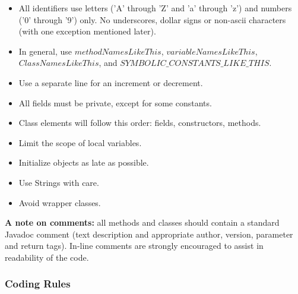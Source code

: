 \documentclass[12pt]{article}
\begin{document}
\begin{itemize}

\item All identifiers use letters ('A' through 'Z' and 'a' through 'z') and numbers ('0' through '9') only. No underscores, dollar signs or non-ascii characters (with one exception mentioned later).

\item In general, use $methodNamesLikeThis$, $variableNamesLikeThis$, $ClassNamesLikeThis$, and $SYMBOLIC\_CONSTANTS\_LIKE\_THIS$.

\item Use a separate line for an increment or decrement.

\item All fields must be private, except for some constants.

\item Class elements will follow this order: fields, constructors, methods.

\item Limit the scope of local variables.

\item Initialize objects as late as possible.

\item Use Strings with care.

\item Avoid wrapper classes.

\end{itemize}

\textbf{A note on comments:} all methods and classes should contain a standard Javadoc comment (text description and appropriate author, version, parameter and return tags).  In-line comments are strongly encouraged to assist in readability of the code.



\subsubsection{Coding Rules}
\end{document}
